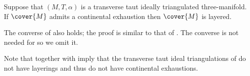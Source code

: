 \documentclass[12pt]{amsart}
\begin{document}
\begin{proposition}
\label{Prop:ExhaustImpliesLayered}
Suppose that $(M, T, \alpha)$ is a transverse taut ideally triangulated three-manifold.  If $\cover{M}$ admits a continental exhaustion then $\cover{M}$ is layered. 
\end{proposition}

\begin{remark}
\label{Rem:LayeredImpliesExhaust}
The converse of  also holds; the proof is similar to that of .  The converse is not needed for  so we omit it. 
\end{remark}


\begin{remark}
\label{Rem:BadExample}
Note that  together with  imply that the transverse taut ideal triangulations of  
do not have layerings and thus do not have continental exhaustions.
\end{remark}
\end{document}
